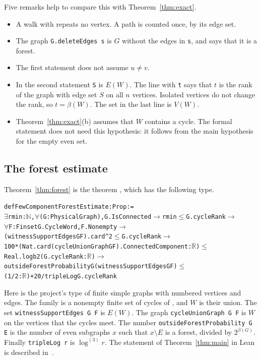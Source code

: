 \documentclass[11pt]{article}
\theoremstyle{definition}
\theoremstyle{remark}
\newcommand{\lgk}[1]{\log^{(#1)}}
\newcommand{\sm}{\setminus}
\numberwithin{equation}{section}
\begin{document}
Five remarks help to compare this with Theorem~\ref{thm:exact}.
\begin{itemize}
\item A walk with  repeats no vertex. A path is counted once, by its edge set.
\item The graph \texttt{G.deleteEdges s} is $G$ without the edges in \texttt{s}, and
 says that it is a forest.
\item The first statement does not assume $u\ne v$.
\item In the second statement \texttt{S} is $E(W)$. The line with \texttt{t} says that $t$ is the
rank of the graph with edge set $S$ on all $n$ vertices. Isolated vertices do not change the rank,
so $t=\beta(W)$. The set in the last line is $V(W)$.
\item Theorem~\ref{thm:exact}(b) assumes that $W$ contains a cycle. The formal statement does not
need this hypothesis: it follows from the main hypothesis for the empty even set.
\end{itemize}

\subsection{The forest estimate}

Theorem~\ref{thm:forest} is the theorem , which has the
following type.

{\small
\begin{alltt}
def FewComponentForestEstimate : Prop :=
  \(\exists\) rmin : \(\mathbb{N}\), \(\forall\) (G : PhysicalGraph), G.IsConnected \(\to\) rmin \(\le\) G.cycleRank \(\to\)
    \(\forall\) F : Finset G.CycleWord, F.Nonempty \(\to\)
      (witnessSupportEdges G F).card ^ 2 \(\le\) G.cycleRank \(\to\)
      100 * (Nat.card (cycleUnionGraph G F).ConnectedComponent : \(\mathbb{R}\)) \(\le\)
        Real.logb 2 (G.cycleRank : \(\mathbb{R}\)) \(\to\)
      outsideForestProbability G (witnessSupportEdges G F) \(\le\)
        (1 / 2 : \(\mathbb{R}\)) + 20 / tripleLog G.cycleRank
\end{alltt}}

Here  is the project's type of finite simple graphs with numbered vertices and
edges. The family  is a nonempty finite set of cycles of , and $W$ is their union.
The set \texttt{witnessSupportEdges G F} is $E(W)$. The graph \texttt{cycleUnionGraph G F} is $W$ on
the vertices that the cycles meet. The number \texttt{outsideForestProbability G E} is the number of
even subgraphs $x$ such that $x\sm E$ is a forest, divided by $2^{\beta(G)}$. Finally
\texttt{tripleLog r} is $\lgk3r$. The statement of Theorem~\ref{thm:main} in Lean is described
in~\cite[\S1.2]{KNT}.
\end{document}
